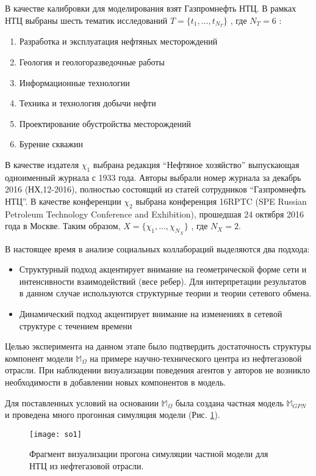 В качестве калибровки для моделирования взят Газпромнефть НТЦ. 
В рамках НТЦ выбраны шесть тематик исследований $T = \{ t_1, \dots , t_{N_T} \} $ , где $N_T = 6 $ :

\begin{enumerate}
\tightlist
\item Разработка и эксплуатация нефтяных месторождений
\item Геология и геологоразведочные работы
\item Информационные технологии
\item Техника и технология добычи нефти
\item Проектирование обустройства месторождений
\item Бурение скважин
\end{enumerate}

В качестве издателя $\chi_1$ выбрана редакция ``Нефтяное хозяйство'' выпускающая одноименный журнала с 1933 года. Авторы выбрали номер журнала за декабрь 2016 (НХ,12-2016), полностью состоящий из статей сотрудников ``Газпромнефть НТЦ''. В качестве конференции $\chi_2$ выбрана конференция 16RPTC (SPE Russian Petroleum Technology Conference and Exhibition), прошедшая 24 октября 2016 года в Москве. 
Таким образом, $X = \{ \chi_1, \dots , \chi_{N_X} \} $ , где $ N_{X} = 2$.

В настоящее время в анализе социальных коллабораций выделяются два подхода:
\begin{itemize}
\tightlist
\item Структурный подход акцентирует внимание на геометрической форме сети и интенсивности взаимодействий (весе ребер). Для интерпретации результатов в данном случае используются структурные теории и теории сетевого обмена.
\item Динамический подход акцентирует внимание на изменениях в сетевой структуре с течением времени
\end{itemize}

Целью эксперимента  на данном этапе было подтвердить достаточность структуры компонент модели $\mathbb{M}_{\Omega}$ на примере научно-технического центра из нефтегазовой отрасли. При наблюдении визуализации поведения агентов у авторов не возникло необходимости в добавлении новых компонентов в модель.

Для поставленных условий на основании $\mathbb{M}_{\Omega}$ была создана частная модель $\mathbb{M}_{GPN}$  и проведена много прогонная симуляция модели (Рис. \ref{fig:so1}).

\begin{figure}[H]
  \caption{Фрагмент визуализации прогона симуляции частной модели для НТЦ из нефтегазовой отрасли.}
  \centering
    \texttt{[image: so1]}
  \label{fig:so1}
\end{figure}  


